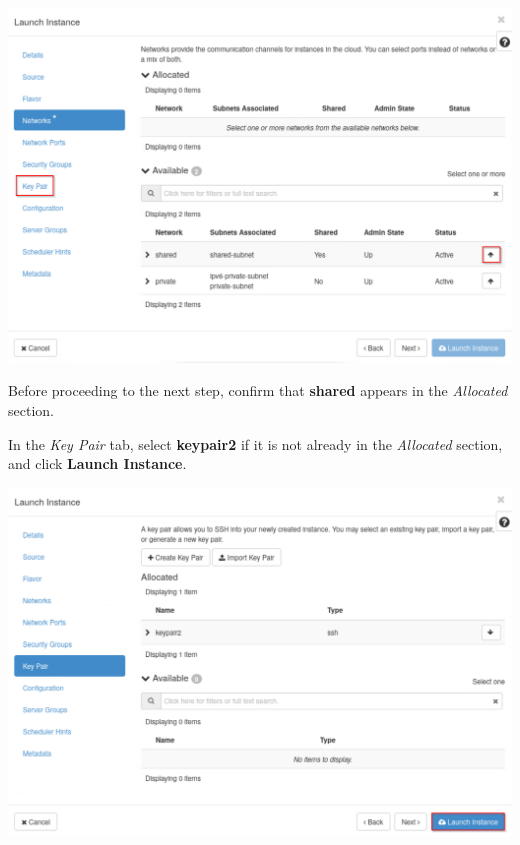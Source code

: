\documentclass[letterpaper, 12pt]{article}
\begin{document}
\begin{enumerate}
\begin{labstep}
        \begin{center}
            \includegraphics[width=\linewidth]{images/part8/step10.png}
        \end{center}
    \end{labstep}

    \begin{stopbox}
        Before proceeding to the next step, confirm that \textbf{shared} appears in the \textit{Allocated} section.
    \end{stopbox}

    \begin{labstep}
        In the \textit{Key Pair} tab, select \textbf{keypair2} if it is not already in the \textit{Allocated} section, and click \textbf{Launch Instance}.

        \begin{center}
            \includegraphics[width=\linewidth]{images/part8/step11.png}
        \end{center}
    \end{labstep}


\end{enumerate}
\end{document}
